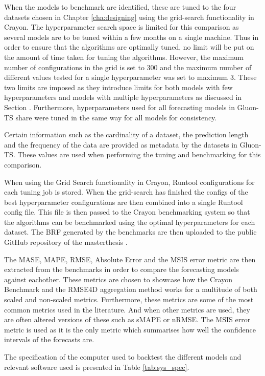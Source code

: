 When the models to benchmark are identified, these are tuned to the four datasets chosen in Chapter \ref{cha:designing} using the grid-search functionality in Crayon. The hyperparameter search space is limited for this comparison as several models are to be tuned within a few months on a single machine. Thus in order to ensure that the algorithms are optimally tuned, no limit will be put on the amount of time taken for tuning the algorithms. However, the maximum number of configurations in the grid is set to 300 and the maximum number of different values tested for a single hyperparameter was set to maximum 3. These two limits are imposed as they introduce limits for both models with few hyperparameters and models with multiple hyperparameters as discussed in Section \cite{dockerhub_arangatang}. Furthermore, hyperparameters used for all forecasting models in Gluon-TS share were tuned in the same way for all models for consistency.

Certain information such as the cardinality of a dataset, the prediction length and the frequency of the data are provided as metadata by the datasets in Gluon-TS. These values are used when performing the tuning and benchmarking for this comparison.

When using the Grid Search functionality in Crayon, Runtool configurations for each tuning job is stored. When the grid-search has finished the configs of the best hyperparameter configurations are then combined into a single Runtool config file. This file is then passed to the Crayon benchmarking system so that the algorithms can be benchmarked using the optimal hyperparameters for each dataset. The BRF generated by the benchmarks are then uploaded to the public GitHub repository of the masterthesis \cite{masterthesis_github}.

The MASE, MAPE, RMSE, Absolute Error and the MSIS error metric are then extracted from the benchmarks in order to compare the forecasting models against eachother. These metrics are chosen to showcase how the Crayon Benchmark and the RMSE4D aggregation method works for a multitude of both scaled and non-scaled metrics. Furthermore, these metrics are some of the most common metrics used in the literature. And when other metrics are used, they are often altered versions of these such as sMAPE or nRMSE. The MSIS error metric is used as it is the only metric which summarises how well the confidence intervals of the forecasts are.

The specification of the computer used to backtest the different models and relevant software used is presented in Table \ref{tab:sys_spec}.

